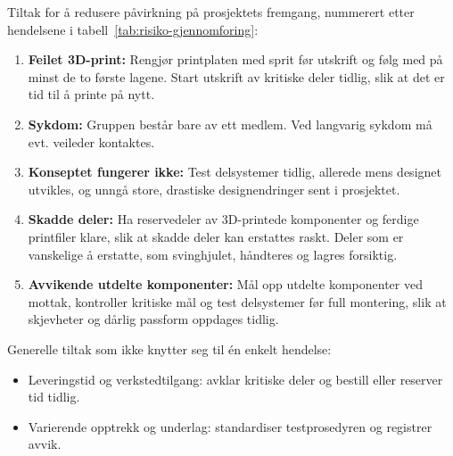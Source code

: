 Tiltak for å redusere påvirkning på prosjektets fremgang, nummerert etter hendelsene i tabell~\ref{tab:risiko-gjennomforing}:
\begin{enumerate}
    \item \textbf{Feilet 3D-print:} Rengjør printplaten med sprit før utskrift og følg med på minst de to første lagene. Start utskrift av kritiske deler tidlig, slik at det er tid til å printe på nytt.
    \item \textbf{Sykdom:} Gruppen består bare av ett medlem. Ved langvarig sykdom må evt. veileder kontaktes. 
    \item \textbf{Konseptet fungerer ikke:} Test delsystemer tidlig, allerede mens designet utvikles, og unngå store, drastiske designendringer sent i prosjektet.
    \item \textbf{Skadde deler:} Ha reservedeler av 3D-printede komponenter og ferdige printfiler klare, slik at skadde deler kan erstattes raskt. Deler som er vanskelige å erstatte, som svinghjulet, håndteres og lagres forsiktig.
    \item \textbf{Avvikende utdelte komponenter:} Mål opp utdelte komponenter ved mottak, kontroller kritiske mål og test delsystemer før full montering, slik at skjevheter og dårlig passform oppdages tidlig.
\end{enumerate}
Generelle tiltak som ikke knytter seg til én enkelt hendelse:
\begin{itemize}
    \item Leveringstid og verkstedtilgang: avklar kritiske deler og bestill eller reserver tid tidlig.
    \item Varierende opptrekk og underlag: standardiser testprosedyren og registrer avvik.
\end{itemize}
